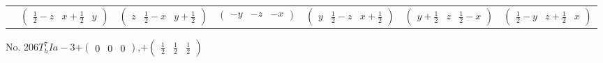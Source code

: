 \documentclass[fleqn,9pt,landscape]{jsarticle}
\begin{document}
\begin{center}
\begin{longtable}{ccccccc}
& $ \begin{pmatrix} \frac{1}{2} - z & x + \frac{1}{2} & y \end{pmatrix} $ & $ \begin{pmatrix} z & \frac{1}{2} - x & y + \frac{1}{2} \end{pmatrix} $ & $ \begin{pmatrix} - y & - z & - x \end{pmatrix} $ & $ \begin{pmatrix} y & \frac{1}{2} - z & x + \frac{1}{2} \end{pmatrix} $ & $ \begin{pmatrix} y + \frac{1}{2} & z & \frac{1}{2} - x \end{pmatrix} $ & $ \begin{pmatrix} \frac{1}{2} - y & z + \frac{1}{2} & x \end{pmatrix} $ \\
\end{longtable}
\end{center}
\newpage
No. 206\quad$T_{h}^{7}$\quad$Ia-3$\quad[ cubic ]\quad$+\begin{pmatrix} 0 & 0 & 0 \end{pmatrix}$,\quad $+\begin{pmatrix} \frac{1}{2} & \frac{1}{2} & \frac{1}{2} \end{pmatrix}$
\end{document}
